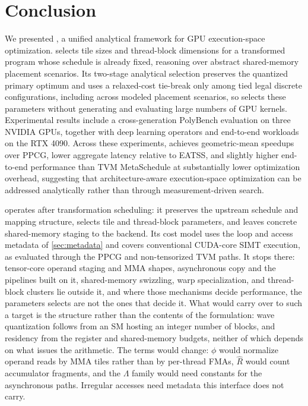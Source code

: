 \section{Conclusion}
\label{sec:conclusion}

We presented \name, a unified analytical framework for GPU execution-space optimization. \name selects tile sizes and thread-block dimensions for a transformed program whose schedule is already fixed, reasoning over abstract shared-memory placement scenarios. Its two-stage analytical selection preserves the quantized primary optimum and uses a relaxed-cost tie-break only among tied legal discrete configurations, including across modeled placement scenarios, so \name selects these parameters without generating and evaluating large numbers of GPU kernels. Experimental results include a cross-generation PolyBench evaluation on three NVIDIA GPUs, together with deep learning operators and end-to-end workloads on the RTX 4090. Across these experiments, \name achieves geometric-mean speedups over PPCG, lower aggregate latency relative to EATSS, and slightly higher end-to-end performance than TVM MetaSchedule at substantially lower optimization overhead, suggesting that architecture-aware execution-space optimization can be addressed analytically rather than through measurement-driven search.

\name operates after transformation scheduling: it preserves the upstream schedule and mapping structure, selects tile and thread-block parameters, and leaves concrete shared-memory staging to the backend. Its cost model uses the loop and access metadata of \autoref{sec:metadata} and covers conventional CUDA-core SIMT execution, as evaluated through the PPCG and non-tensorized TVM paths. It stops there: tensor-core operand staging and MMA shapes, asynchronous copy and the pipelines built on it, shared-memory swizzling, warp specialization, and thread-block clusters lie outside it, and where those mechanisms decide performance, the parameters \name selects are not the ones that decide it. What would carry over to such a target is the structure rather than the contents of the formulation: wave quantization follows from an SM hosting an integer number of blocks, and residency from the register and shared-memory budgets, neither of which depends on what issues the arithmetic. The terms would change: \(\phi\) would normalize operand reads by MMA tiles rather than by per-thread FMAs, \(\hat R\) would count accumulator fragments, and the \(\Lambda\) family would need constants for the asynchronous paths. Irregular accesses need metadata this interface does not carry.
